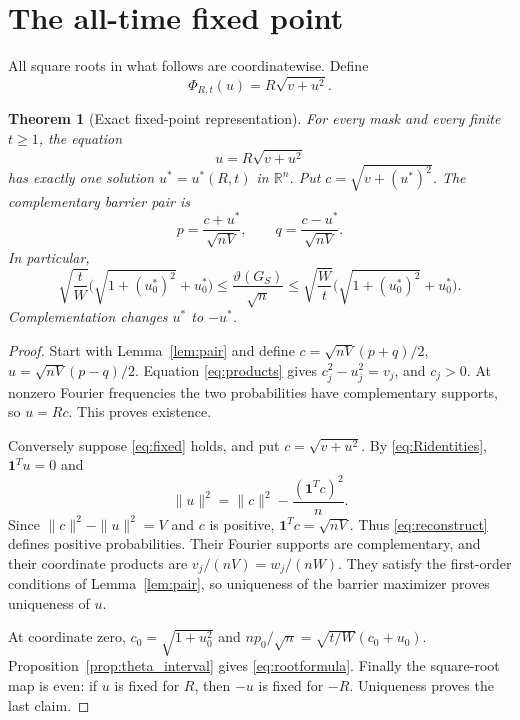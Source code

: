 \documentclass[11pt]{article}
\newtheorem{theorem}{Theorem}[section]
\theoremstyle{remark}\newtheorem{remark}[theorem]{Remark}
\newcommand{\R}{\mathbb R}
\newcommand{\one}{\mathbf 1}
\newcommand{\tht}{\vartheta}
\begin{document}
\section{The all-time fixed point}
All square roots in what follows are coordinatewise. Define
\begin{equation}\label{eq:map}
 \Phi_{R,t}(u)=R\sqrt{v+u^2}.
\end{equation}

\begin{theorem}[Exact fixed-point representation]\label{thm:fixed}
For every mask and every finite $t\ge1$, the equation
\begin{equation}\label{eq:fixed}
 u=R\sqrt{v+u^2}
\end{equation}
has exactly one solution $u^*=u^*(R,t)$ in $\R^n$. Put
$c=\sqrt{v+(u^*)^2}$. The complementary barrier pair is
\begin{equation}\label{eq:reconstruct}
 p=\frac{c+u^*}{\sqrt{nV}},\qquad
 q=\frac{c-u^*}{\sqrt{nV}}.
\end{equation}
In particular,
\begin{equation}\label{eq:rootformula}
 \sqrt{\frac tW}\bigl(\sqrt{1+(u^*_0)^2}+u^*_0\bigr)
 \le\frac{\tht(G_S)}{\sqrt n}
 \le\sqrt{\frac Wt}\bigl(\sqrt{1+(u^*_0)^2}+u^*_0\bigr).
\end{equation}
Complementation changes $u^*$ to $-u^*$.
\end{theorem}
\begin{proof}
Start with Lemma~\ref{lem:pair} and define
$c=\sqrt{nV}(p+q)/2$, $u=\sqrt{nV}(p-q)/2$. Equation
\eqref{eq:products} gives $c_j^2-u_j^2=v_j$, and $c_j>0$.
At nonzero Fourier frequencies the two probabilities have complementary
supports, so $u=Rc$. This proves existence.

Conversely suppose \eqref{eq:fixed} holds, and put $c=\sqrt{v+u^2}$.
By \eqref{eq:Ridentities}, $\one^Tu=0$ and
\[
 \|u\|^2=\|c\|^2-\frac{(\one^Tc)^2}{n}.
\]
Since $\|c\|^2-\|u\|^2=V$ and $c$ is positive,
$\one^Tc=\sqrt{nV}$. Thus \eqref{eq:reconstruct} defines positive
probabilities. Their Fourier supports are complementary, and their
coordinate products are $v_j/(nV)=w_j/(nW)$. They satisfy the
first-order conditions of Lemma~\ref{lem:pair}, so uniqueness of the barrier
maximizer proves uniqueness of $u$.

At coordinate zero, $c_0=\sqrt{1+u_0^2}$ and
$np_0/\sqrt n=\sqrt{t/W}(c_0+u_0)$. Proposition~\ref{prop:theta_interval}
gives \eqref{eq:rootformula}. Finally the square-root map is even: if $u$ is
fixed for $R$, then $-u$ is fixed for $-R$. Uniqueness proves the last claim.
\end{proof}
\end{document}
